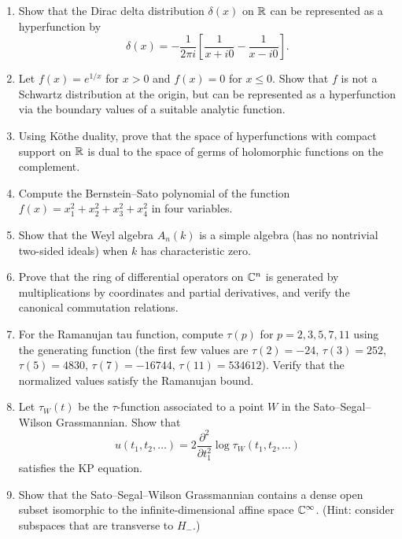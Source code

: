 \begin{enumerate}
    \item [B] Show that the Dirac delta distribution \(\delta(x)\) on \(\mathbb{R}\) can be represented as a hyperfunction by
    \[
    \delta(x) = -\frac{1}{2\pi i} \left[\frac{1}{x + i0} - \frac{1}{x - i0}\right].
    \]
    
    \item [I] Let \(f(x) = e^{1/x}\) for \(x > 0\) and \(f(x) = 0\) for \(x \leq 0\). Show that \(f\) is not a Schwartz distribution at the origin, but can be represented as a hyperfunction via the boundary values of a suitable analytic function.
    
    \item [A] Using K\"othe duality, prove that the space of hyperfunctions with compact support on \(\mathbb{R}\) is dual to the space of germs of holomorphic functions on the complement.
    
    \item [A] Compute the Bernstein--Sato polynomial of the function \(f(x) = x_1^2 + x_2^2 + x_3^2 + x_4^2\) in four variables.
    
    \item [I] Show that the Weyl algebra \(A_n(k)\) is a simple algebra (has no nontrivial two-sided ideals) when \(k\) has characteristic zero.
    
    \item [I] Prove that the ring of differential operators on \(\mathbb{C}^n\) is generated by multiplications by coordinates and partial derivatives, and verify the canonical commutation relations.
    
    \item [B] For the Ramanujan tau function, compute \(\tau(p)\) for \(p = 2, 3, 5, 7, 11\) using the generating function (the first few values are \(\tau(2) = -24\), \(\tau(3) = 252\), \(\tau(5) = 4830\), \(\tau(7) = -16744\), \(\tau(11) = 534612\)). Verify that the normalized values satisfy the Ramanujan bound.
    
    \item [I] Let \(\tau_W(t)\) be the \(\tau\)-function associated to a point \(W\) in the Sato--Segal--Wilson Grassmannian. Show that
    \[
    u(t_1, t_2, \dots) = 2 \frac{\partial^2}{\partial t_1^2} \log \tau_W(t_1, t_2, \dots)
    \]
    satisfies the KP equation.
    
    \item [A] Show that the Sato--Segal--Wilson Grassmannian contains a dense open subset isomorphic to the infinite-dimensional affine space \(\mathbb{C}^\infty\). (Hint: consider subspaces that are transverse to \(H_-\).)
    

\end{enumerate}
